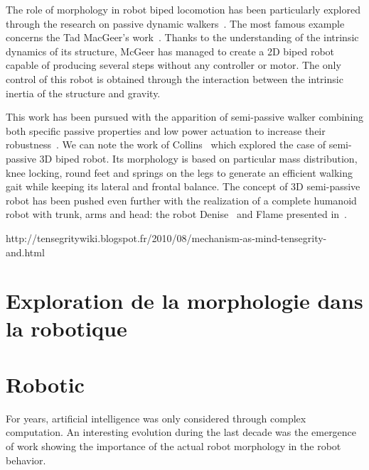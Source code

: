 The role of morphology in robot biped locomotion has been particularly explored through the research on passive dynamic walkers~\cite{wisse2007passive}.
The most famous example concerns the Tad MacGeer's work~\cite{mcgeer1990passive}.
Thanks to the understanding of the intrinsic dynamics of its structure, McGeer has managed to create a 2D biped robot capable of producing several steps without any controller or motor.
The only control of this robot is obtained through the interaction between the intrinsic inertia of the structure and gravity.

\begin{figure}[]
\centering
    \hfil
    \caption{}
    \label{fig:mcgeer_work}
\end{figure}

This work has been pursued with the apparition of semi-passive walker combining both specific passive properties and low power actuation to increase their robustness~\cite{Anderson2005}.
We can note the work of Collins~\cite{collins2005bipedal} which explored the case of semi-passive 3D biped robot.
Its morphology is based on particular mass distribution, knee locking, round feet and springs on the legs to generate an efficient walking gait while keeping its lateral and frontal balance.
The concept of 3D semi-passive robot has been pushed even further with the realization of a complete humanoid robot with trunk, arms and head: the robot Denise~\cite{wisse2005three} and Flame presented in~\cite{Hobbelen2008}.

http://tensegritywiki.blogspot.fr/2010/08/mechanism-as-mind-tensegrity-and.html




\section{Exploration de la morphologie dans la robotique} %


\section{Robotic} %
For years, artificial intelligence was only considered through complex computation.
An interesting evolution during the last decade was the emergence of work showing the importance of the actual robot morphology in the robot behavior.

